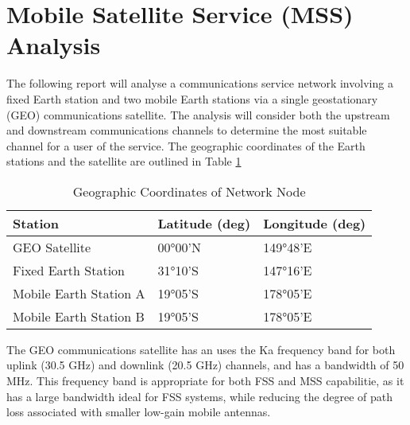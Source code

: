 \documentclass[12pt]{article}
\begin{document}
\FirstPage
\pagebreak

\setlength{\parskip}{0em}
\renewcommand{\baselinestretch}{0.95}\normalsize
\tableofcontents
\renewcommand{\baselinestretch}{1.0}\normalsize
\setlength{\parskip}{1em}
\newpage

\section{Mobile Satellite Service (MSS) Analysis}

\raggedright

The following report will analyse a communications service network involving a fixed Earth station and two mobile Earth stations via a single geostationary (GEO) communications satellite. The analysis will consider both the upstream and downstream communications channels to determine the most suitable channel for a user of the service. The geographic coordinates of the Earth stations and the satellite are outlined in Table \ref{table:geo_coords}

\begin{table}[H]
\centering
\caption{Geographic Coordinates of Network Node}
\label{table:geo_coords}
\begin{tabular}{lll}
 \hline
Station                           & Latitude (deg) & Longitude (deg) \\
\hline
GEO Satellite                     & 00°00'N        & 149°48'E        \\
Fixed Earth Station               & 31°10'S        & 147°16'E        \\
Mobile Earth Station A            & 19°05'S        & 178°05'E        \\
Mobile Earth Station B            & 19°05'S        & 178°05'E         \\
 \hline
\end{tabular}
\end{table}

The GEO communications satellite has an uses the Ka frequency band for both uplink (30.5 GHz) and downlink (20.5 GHz) channels, and has a bandwidth of 50 MHz. This frequency band is appropriate for both FSS and MSS capabilitie, as it has a large bandwidth ideal for FSS systems, while reducing the degree of path loss associated with smaller low-gain mobile antennas. 
\end{document}
